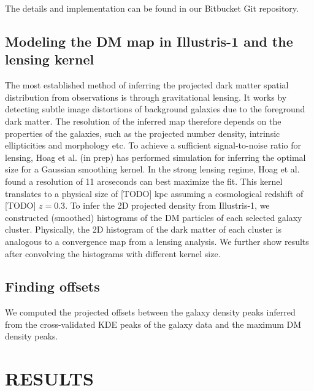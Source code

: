 The details and implementation can be found in our Bitbucket Git repository.



\subsection{Modeling the DM map in Illustris-1 and the lensing kernel}
The most established method of inferring the projected dark matter spatial 
distribution from observations is through gravitational lensing.
It works by detecting subtle image distortions of background galaxies due to
the foreground dark matter. The resolution of the inferred map therefore 
depends on the properties of the galaxies, such as the projected number density, 
intrinsic ellipticities and morphology etc.
To achieve a sufficient signal-to-noise ratio for lensing, 
Hoag et al. (in prep) has performed simulation for inferring the optimal size
for a Gaussian smoothing kernel. 
In the strong lensing regime, Hoag et al. found a resolution of 11 arcseconds
can best maximize the fit. This kernel translates to a physical size of [TODO]
kpc assuming a cosmological redshift of [TODO] $z = 0.3$.
To infer the 2D projected density from Illustris-1, 
we constructed (smoothed) histograms of the DM
particles of each selected galaxy cluster. 
Physically, the 2D histogram of the dark matter of each cluster 
is analogous to a convergence map from a lensing analysis. 
We further show results after convolving the histograms with different kernel
size.   




\subsection{Finding offsets} 
We computed the projected offsets between the galaxy density peaks inferred from the
cross-validated KDE peaks of the galaxy data and the maximum DM density peaks.






\section{RESULTS} 
\label{sec:results}




